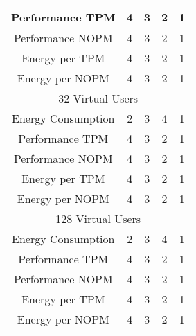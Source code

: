 \begin{table}[H]
\begin{tabular}{|c|c|c|c|c|}
Performance TPM    & 4                          & 3                             & 2                            & 1     \\ \hline
Performance NOPM   & 4                          & 3                             & 2                            & 1     \\ \hline
Energy per TPM     & 4                          & 3                             & 2                            & 1     \\ \hline
Energy per NOPM    & 4                          & 3                             & 2                            & 1     \\ \hline
\multicolumn{5}{|c|}{32 Virtual Users}                                                                                 \\ \hline
Energy Consumption & 2                          & 3                             & 4                            & 1     \\ \hline
Performance TPM    & 4                          & 3                             & 2                            & 1     \\ \hline
Performance NOPM   & 4                          & 3                             & 2                            & 1     \\ \hline
Energy per TPM     & 4                          & 3                             & 2                            & 1     \\ \hline
Energy per NOPM    & 4                          & 3                             & 2                            & 1     \\ \hline
\multicolumn{5}{|c|}{128 Virtual Users}                                                                                \\ \hline
Energy Consumption & 2                          & 3                             & 4                            & 1     \\ \hline
Performance TPM    & 4                          & 3                             & 2                            & 1     \\ \hline
Performance NOPM   & 4                          & 3                             & 2                            & 1     \\ \hline
Energy per TPM     & 4                          & 3                             & 2                            & 1     \\ \hline
Energy per NOPM    & 4                          & 3                             & 2                            & 1     \\ \hline
\end{tabular}
\end{table}